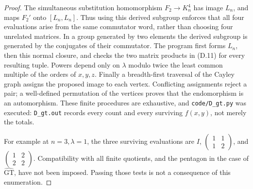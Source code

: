 \begin{proof}
The simultaneous substitution homomorphism \(F_2\to K_n^4\)
has image \(L_n\), and maps \(F_2'\) onto \([L_n,L_n]\).
Thus using this derived subgroup enforces that all four
evaluations arise from the same commutator word, rather than
choosing four unrelated matrices.  In a group generated by two
elements the derived subgroup is generated by the conjugates of
their commutator.  The program first forms \(L_n\), then this
normal closure, and checks the two matrix products in (D.11)
for every resulting tuple.  Powers depend only on \(\lambda\)
modulo twice the least common multiple of the orders of \(x,y,z\).
Finally a breadth-first traversal of the Cayley graph assigns
the proposed image to each vertex.  Conflicting assignments
reject a pair; a well-defined permutation of the vertices proves
that the endomorphism is an automorphism.  These finite procedures
are exhaustive, and \texttt{code/D\_gt.py} was executed:
\texttt{D\_gt.out} records every count and every surviving
\(f(x,y)\), not merely the totals.

For example at \(n=3,\lambda=1\), the three surviving evaluations
are \(I\),
\(\left(\begin{smallmatrix}1&1\\1&2\end{smallmatrix}\right)\),
and \(\left(\begin{smallmatrix}1&2\\2&2\end{smallmatrix}\right)\).
Compatibility with all finite quotients, and the pentagon in
the case of \(\widehat{\mathrm{GT}}\), have not been imposed.
Passing those tests is not a consequence of this enumeration.
\end{proof}

